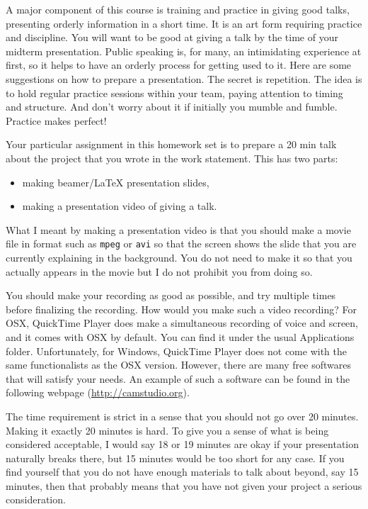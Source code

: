 \documentclass[12pt]{article}
\begin{document}
A major component of this course is training and practice in
giving good talks, presenting orderly information in a short
time. It is an art form requiring practice and discipline. You will
want to be good at giving a talk by the time of your midterm
presentation.  Public speaking is, for many, an intimidating experience at first, so
it helps to have an orderly process for getting used to it. Here are
some suggestions on how to prepare a presentation. 
The secret is repetition. The idea is to hold regular
practice sessions within your team, paying attention to timing and
structure. And don't worry about it if initially you mumble and
fumble. Practice makes perfect!

Your particular assignment in this homework set is to prepare a 20 min 
talk about the project that  you wrote in the work statement. This has two 
parts: 
\begin{itemize}
\item making beamer/LaTeX presentation slides,
\item making a presentation video of giving a talk.
\end{itemize}

What I meant by making a presentation video 
is that you should make a movie file in format such as 
\texttt{mpeg} or \texttt{avi} so that 
the screen shows the slide that you 
are currently explaining in the background.
You do not need to make it so that you actually 
appears in the movie but I do not prohibit you from doing so. 

You should make your recording as good as possible,
and try multiple times before finalizing the recording. 
How would you make such a video recording? 
For OSX, QuickTime Player does make a 
simultaneous recording of voice and screen, and it 
comes with OSX by default. You can find it under 
the usual Applications folder.  
Unfortunately, for Windows, QuickTime Player does not 
come with the same functionalists as the OSX version. However, 
there are many  free softwares that will satisfy your needs. 
An example of such a software can be found in the following webpage
(\url{http://camstudio.org}).

The time requirement is strict in a sense that 
you should not go over 20 minutes. Making 
it exactly 20 minutes is hard. To give you a sense of  
what is being considered acceptable, 
I would say 18 or 19 minutes 
are okay if your presentation naturally breaks there,
but 15 minutes would be too short for any case. 
If you find yourself that you do not have enough 
materials to talk about beyond, say 15 minutes, 
then that probably means that you have not given your project a
serious consideration.
\end{document}
